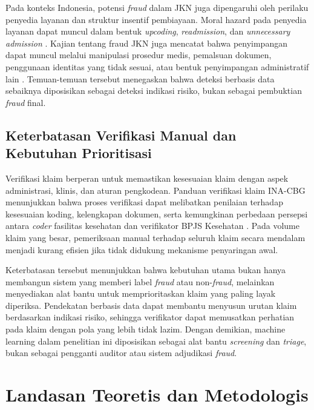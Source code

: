 Pada konteks Indonesia, potensi \emph{fraud} dalam JKN juga dipengaruhi oleh perilaku penyedia layanan dan struktur insentif pembiayaan. Moral hazard pada penyedia layanan dapat muncul dalam bentuk \emph{upcoding}, \emph{readmission}, dan \emph{unnecessary admission} \citep{syafrawati2023}. Kajian tentang fraud JKN juga mencatat bahwa penyimpangan dapat muncul melalui manipulasi prosedur medis, pemalsuan dokumen, penggunaan identitas yang tidak sesuai, atau bentuk penyimpangan administratif lain \citep{muliarta2023,nurlianti2025}. Temuan-temuan tersebut menegaskan bahwa deteksi berbasis data sebaiknya diposisikan sebagai deteksi indikasi risiko, bukan sebagai pembuktian \emph{fraud} final.

\subsection{Keterbatasan Verifikasi Manual dan Kebutuhan Prioritisasi}\label{keterbatasan-verifikasi-manual-dan-kebutuhan-prioritisasi}

Verifikasi klaim berperan untuk memastikan kesesuaian klaim dengan aspek administrasi, klinis, dan aturan pengkodean. Panduan verifikasi klaim INA-CBG menunjukkan bahwa proses verifikasi dapat melibatkan penilaian terhadap kesesuaian koding, kelengkapan dokumen, serta kemungkinan perbedaan persepsi antara \emph{coder} fasilitas kesehatan dan verifikator BPJS Kesehatan \citep{bpjs2018}. Pada volume klaim yang besar, pemeriksaan manual terhadap seluruh klaim secara mendalam menjadi kurang efisien jika tidak didukung mekanisme penyaringan awal.

Keterbatasan tersebut menunjukkan bahwa kebutuhan utama bukan hanya membangun sistem yang memberi label \emph{fraud} atau non-\emph{fraud}, melainkan menyediakan alat bantu untuk memprioritaskan klaim yang paling layak diperiksa. Pendekatan berbasis data dapat membantu menyusun urutan klaim berdasarkan indikasi risiko, sehingga verifikator dapat memusatkan perhatian pada klaim dengan pola yang lebih tidak lazim. Dengan demikian, machine learning dalam penelitian ini diposisikan sebagai alat bantu \emph{screening} dan \emph{triage}, bukan sebagai pengganti auditor atau sistem adjudikasi \emph{fraud}.

\section{Landasan Teoretis dan Metodologis}\label{landasan-teoretis-dan-metodologis}

